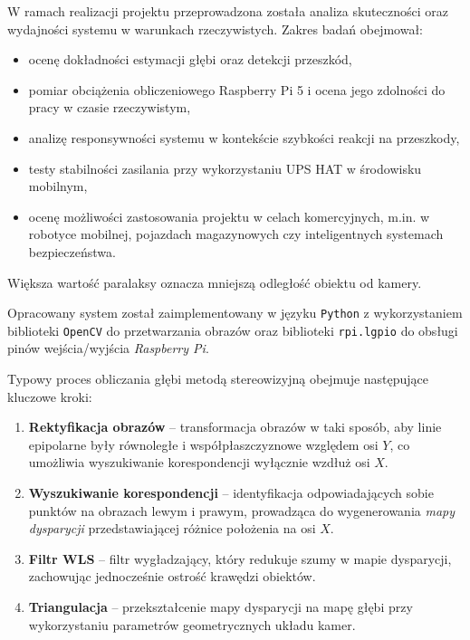 \documentclass[magisterska]{pracadypl}
\begin{document}
\begin{itemize}
\end{itemize}

W ramach realizacji projektu przeprowadzona została analiza skuteczności oraz wydajności systemu w warunkach rzeczywistych. Zakres badań obejmował:

\begin{itemize}
  \item ocenę dokładności estymacji głębi oraz detekcji przeszkód,
  \item pomiar obciążenia obliczeniowego Raspberry Pi 5 i ocena jego zdolności do pracy w czasie rzeczywistym,
  \item analizę responsywności systemu w kontekście szybkości reakcji na przeszkody,
  \item testy stabilności zasilania przy wykorzystaniu UPS HAT w środowisku mobilnym,
  \item ocenę możliwości zastosowania projektu w celach komercyjnych, m.in. w robotyce mobilnej, pojazdach magazynowych czy inteligentnych systemach bezpieczeństwa.
\end{itemize}

Większa wartość paralaksy oznacza mniejszą odległość obiektu od kamery.

Opracowany system został zaimplementowany w języku \texttt{Python} z wykorzystaniem biblioteki \texttt{OpenCV} do przetwarzania obrazów oraz biblioteki \texttt{rpi.lgpio} do obsługi pinów wejścia/wyjścia \textit{Raspberry Pi}.

Typowy proces obliczania głębi metodą stereowizyjną obejmuje następujące kluczowe kroki:

\begin{enumerate}
    \item \textbf{Rektyfikacja obrazów} – transformacja obrazów w taki sposób, aby linie epipolarne były równoległe i współpłaszczyznowe względem osi \(Y\), co umożliwia wyszukiwanie korespondencji wyłącznie wzdłuż osi \(X\).
    \item \textbf{Wyszukiwanie korespondencji} – identyfikacja odpowiadających sobie punktów na obrazach lewym i prawym, prowadząca do wygenerowania \textit{mapy dysparycji} przedstawiającej różnice położenia na osi \(X\).
    \item \textbf{Filtr WLS} – filtr wygładzający, który redukuje szumy w mapie dysparycji, zachowując jednocześnie ostrość krawędzi obiektów.
    \item \textbf{Triangulacja} – przekształcenie mapy dysparycji na mapę głębi przy wykorzystaniu parametrów geometrycznych układu kamer.
\end{enumerate}
\end{document}
